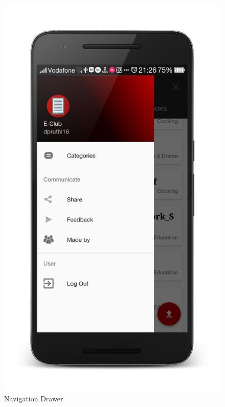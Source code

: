\begin{figure}[ht]
\centering
\includegraphics[scale=0.13]{images/d9.png}
\caption{Navigation Drawer}
\end{figure}

\newpage

